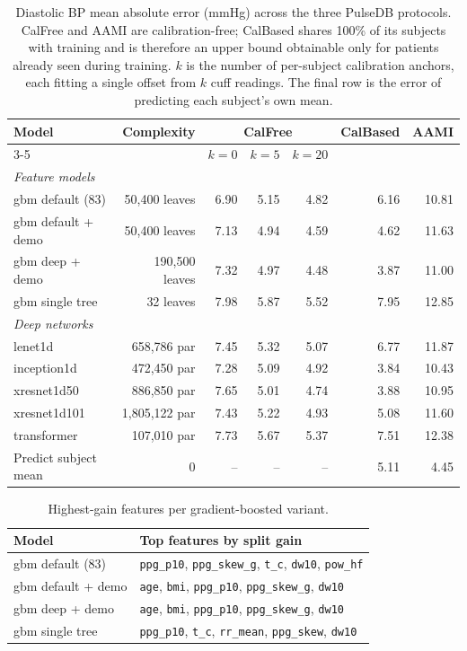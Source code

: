\begin{table}[t]
\centering
\small
\caption{Diastolic BP mean absolute error (mmHg) across the three PulseDB protocols. CalFree and AAMI are calibration-free; CalBased shares 100\% of its subjects with training and is therefore an upper bound obtainable only for patients already seen during training. $k$ is the number of per-subject calibration anchors, each fitting a single offset from $k$ cuff readings. The final row is the error of predicting each subject's own mean.}
\label{tab:protocols}
\begin{tabular}{l r r r r r r}
\toprule
Model & Complexity & \multicolumn{3}{c}{CalFree} & CalBased & AAMI \\
\cmidrule(lr){3-5}
 & & $k{=}0$ & $k{=}5$ & $k{=}20$ & & \\
\midrule
\multicolumn{7}{l}{\textit{Feature models}} \\
\quad gbm default (83) & 50,400 leaves & 6.90 & 5.15 & 4.82 & 6.16 & 10.81 \\
\quad gbm default + demo & 50,400 leaves & 7.13 & 4.94 & 4.59 & 4.62 & 11.63 \\
\quad gbm deep + demo & 190,500 leaves & 7.32 & 4.97 & 4.48 & 3.87 & 11.00 \\
\quad gbm single tree & 32 leaves & 7.98 & 5.87 & 5.52 & 7.95 & 12.85 \\
\multicolumn{7}{l}{\textit{Deep networks}} \\
\quad lenet1d & 658,786 par & 7.45 & 5.32 & 5.07 & 6.77 & 11.87 \\
\quad inception1d & 472,450 par & 7.28 & 5.09 & 4.92 & 3.84 & 10.43 \\
\quad xresnet1d50 & 886,850 par & 7.65 & 5.01 & 4.74 & 3.88 & 10.95 \\
\quad xresnet1d101 & 1,805,122 par & 7.43 & 5.22 & 4.93 & 5.08 & 11.60 \\
\quad transformer & 107,010 par & 7.73 & 5.67 & 5.37 & 7.51 & 12.38 \\
\midrule
Predict subject mean & 0 & -- & -- & -- & 5.11 & 4.45 \\
\bottomrule
\end{tabular}
\end{table}

\begin{table}[t]
\centering
\small
\caption{Highest-gain features per gradient-boosted variant.}
\label{tab:features}
\begin{tabular}{l l}
\toprule
Model & Top features by split gain \\
\midrule
gbm default (83) & \texttt{ppg\_p10}, \texttt{ppg\_skew\_g}, \texttt{t\_c}, \texttt{dw10}, \texttt{pow\_hf} \\
gbm default + demo & \texttt{age}, \texttt{bmi}, \texttt{ppg\_p10}, \texttt{ppg\_skew\_g}, \texttt{dw10} \\
gbm deep + demo & \texttt{age}, \texttt{bmi}, \texttt{ppg\_p10}, \texttt{ppg\_skew\_g}, \texttt{dw10} \\
gbm single tree & \texttt{ppg\_p10}, \texttt{t\_c}, \texttt{rr\_mean}, \texttt{ppg\_skew}, \texttt{dw10} \\
\bottomrule
\end{tabular}
\end{table}